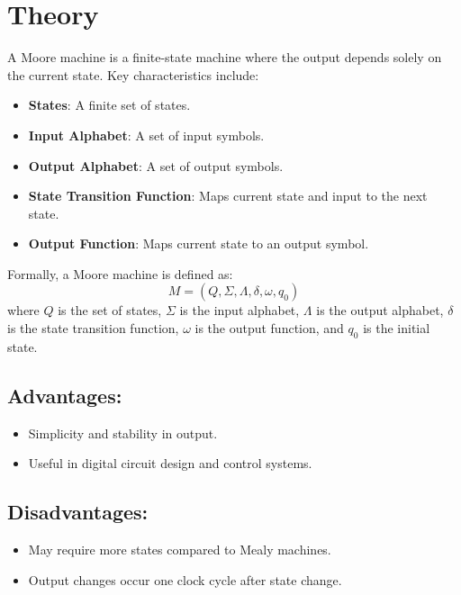 \documentclass[a4paper,12pt]{article}
\begin{document}
\section{Theory}
A Moore machine is a finite-state machine where the output depends solely on the current state. Key characteristics include:
\begin{itemize}
    \item \textbf{States}: A finite set of states.
    \item \textbf{Input Alphabet}: A set of input symbols.
    \item \textbf{Output Alphabet}: A set of output symbols.
    \item \textbf{State Transition Function}: Maps current state and input to the next state.
    \item \textbf{Output Function}: Maps current state to an output symbol.
\end{itemize}

Formally, a Moore machine is defined as:
\[ M = (Q, \Sigma, \Lambda, \delta, \omega, q_0) \]
where \( Q \) is the set of states, \( \Sigma \) is the input alphabet, \( \Lambda \) is the output alphabet, \( \delta \) is the state transition function, \( \omega \) is the output function, and \( q_0 \) is the initial state.

\subsection*{Advantages:}
\begin{itemize}
    \item Simplicity and stability in output.
    \item Useful in digital circuit design and control systems.
\end{itemize}

\subsection*{Disadvantages:}
\begin{itemize}
    \item May require more states compared to Mealy machines.
    \item Output changes occur one clock cycle after state change.
\end{itemize}
\end{document}
